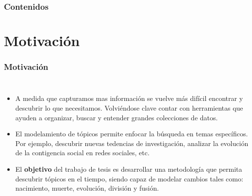 \documentclass[
	spanish, %
	aspectratio=43, %
	hyperref={pdfencoding=auto,psdextra},
	xcolor={dvipsnames,table,usenames}
]{beamer}
\title[\documentsubtitle]{\documenttitle}
\subtitle{\documentsubject}
\author[\documentauthor]{
	\documentauthor \newline\newline
Profesor guía: Richard Weber \newline
Miembros de la comisión: Giorgiogiulio Parra, Ángel Jiménez
}
\institute[UChile]{
	\texttt{[image: \\universitydepartmentimage]} \\
	\medskip
	\universityname \\
	\universityfaculty \\
	\universitydepartment
}
\date[\today]{\footnotesize{\today}}
\begin{document}
\templatePagecfg

\templateFinalcfg

\begin{frame}
	\titlepage
\end{frame}

\begin{frame}
	\frametitle{Contenidos}
	\tableofcontents
\end{frame}

\section{Motivación}
\begin{frame}
\frametitle{Motivación} 

\begin{columns}[c]

\begin{itemize}
  \item A medida que capturamos mas información se vuelve más difícil encontrar y descubrir lo que necesitamos. Volviéndose clave contar con herramientas que ayuden a organizar, buscar y entender grandes colecciones de datos.
  \item El modelamiento de tópicos permite enfocar la búsqueda en temas específicos. Por ejemplo, descubrir nuevas tedencias de investigación, analizar la evolución de la contigencia social en redes sociales, etc.
  \item El \textbf{objetivo} del trabajo de tesis es desarrollar una metodología que permita descubrir tópicos en el tiempo, siendo capaz de modelar cambios tales como: nacimiento, muerte, evolución, división y fusión.
\end{itemize}
\end{columns}




\end{frame}
\end{document}
